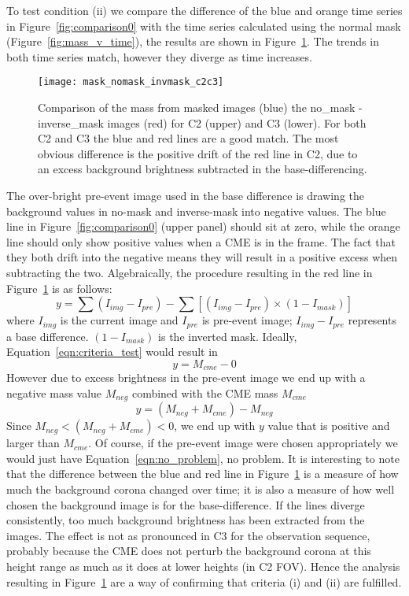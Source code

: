 To test condition (ii) we compare the difference of the blue and orange time series in Figure~\ref{fig:comparison0} with the time series calculated using the normal mask (Figure~\ref{fig:mass_v_time}), the results are shown in Figure~\ref{fig:comparison}. The trends in both time series match, however they diverge as time increases. 
\begin{figure}[t!]
\begin{center}
\texttt{[image: mask\_nomask\_invmask\_c2c3]}
\caption[Mass time series error check]{Comparison of the mass from masked images (blue) the no\_mask - inverse\_mask images (red) for C2 (upper) and C3 (lower). For both C2 and C3 the blue and red lines are a good match. The most obvious difference is the positive drift of the red line in C2, due to an excess background brightness subtracted in the base-differencing.}
\label{fig:comparison}
\end{center}
\end{figure}
The over-bright pre-event image used in the base difference is drawing the background values in no-mask and inverse-mask into negative values. The blue line in Figure~\ref{fig:comparison0} (upper panel) should sit at zero, while the orange line should only show positive values when a CME is in the frame. The fact that they both drift into the negative means they will result in a positive excess when subtracting the two.
Algebraically, the procedure resulting in the red line in Figure~\ref{fig:comparison} is as follows:
\begin{equation}
y = \sum(I_{img} - I_{pre}) - \sum[(I_{img} - I_{pre})\times (1-I_{mask})]
\label{eqn:criteria_test}
\end{equation}
where $I_{img}$ is the current image and $I_{pre}$ is pre-event image; $I_{img} - I_{pre}$ represents a base difference. $(1-I_{mask})$ is the inverted mask. Ideally, Equation~\ref{eqn:criteria_test} would result in
\begin{equation}
y = M_{cme} - 0
\label{eqn:no_problem}
\end{equation}
However due to excess brightness in the pre-event image we end up with a negative mass value $M_{neg}$ combined with the CME mass $M_{cme}$
\begin{equation}
y = (M_{neg} + M_{cme})  - M_{neg}
\end{equation}
Since $M_{neg} < (M_{neg} + M_{cme}   ) < 0$, we end up with $y$ value that is positive and larger than $M_{cme}$. Of course, if the pre-event image were chosen appropriately we would just have Equation~\ref{eqn:no_problem}, no problem. It is interesting to note that the difference between the blue and red line in Figure~\ref{fig:comparison} is a measure of how much the background corona changed over time; it is also a measure of how well chosen the background image is for the base-difference. If the lines diverge consistently, too much background brightness has been extracted from the images. The effect is not as pronounced in C3 for the observation sequence, probably because the CME does not perturb the background corona at this height range as much as it does at lower heights (in C2 FOV). Hence the analysis resulting in Figure~\ref{fig:comparison} are a way of confirming that criteria (i) and (ii) are fulfilled.

